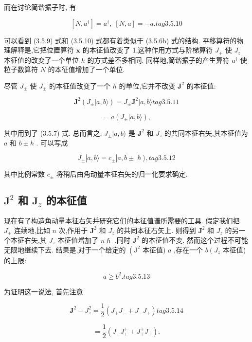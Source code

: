 而在讨论简谐振子时, 有

$$
\left\lbrack {N,{a}^{ \dagger }}\right\rbrack = {a}^{ \dagger },\;\left\lbrack {N, a}\right\rbrack = - a. tag{3. 5.10}
$$

可以看到 (3.5.9) 式和 (3.5.10) 式都有着类似于 (3.5.6b) 式的结构. 平移算符的物理解释是,它把位置算符 $\mathbf{x}$ 的本征值改变了 1,这种作用方式与阶梯算符 ${J}_{ + }$ 使 ${J}_{z}$ 本征值的改变了一个单位 $h$ 的方式差不多相同. 同样地,简谐振子的产生算符 ${a}^{ \dagger }$ 使粒子数算符 $N$ 的本征值增加了一个单位.

尽管 ${J}_{ \pm }$ 使 ${J}_{ \pm }$ 的本征值改变了一个 $h$ 的单位,它并不改变 ${\mathbf{J}}^{2}$ 的本征值:

$$
{\mathbf{J}}^{2}\left( {{J}_{ \pm }|a, b\rangle }\right) = {J}_{ \pm }{\mathbf{J}}^{2}|a, b\rangle tag{3. 5.11}
$$

$$
= a\left( {{J}_{ \pm }|a, b\rangle }\right) ,
$$

其中用到了 (3.5.7) 式. 总而言之, ${J}_{ \pm }|a, b\rangle$ 是 ${\mathbf{J}}^{2}$ 和 ${J}_{z}$ 的共同本征右矢,其本征值为 $a$ 和 $b \pm h$ . 可以写成

$$
{J}_{ \pm }\left| {a, b\rangle = {c}_{ \pm }}\right| a, b \pm \hslash \rangle , tag{3. 5.12}
$$

其中比例常数 ${c}_{ \pm }$ 将稍后由角动量本征右矢的归一化要求确定.

\subsection{${\mathbf{J}}^{2}$ 和 ${\mathbf{J}}_{z}$ 的本征值}

现在有了构造角动量本征右矢并研究它们的本征值谱所需要的工具. 假定我们把 ${J}_{ + }$ 连续地,比如 $n$ 次,作用于 ${\mathbf{J}}^{2}$ 和 ${J}_{z}$ 的共同本征右矢上. 则得到 ${\mathbf{J}}^{2}$ 和 ${J}_{z}$ 的另一个本征右矢,其 ${J}_{z}$ 本征值增加了 $n\hslash$ ,同时 ${\mathbf{J}}^{2}$ 的本征值不变. 然而这个过程不可能无限地继续下去. 结果是,对于一个给定的 $\left( {\mathrm{J}}^{2}\right.$ 本征值) $a$ ,存在一个 $b\left( {J}_{z}\right.$ 本征值) 的上限:

$$
a \geq {b}^{2}\text{.} tag{3.5.13}
$$

为证明这一说法, 首先注意

$$
{\mathbf{J}}^{2} - {J}_{z}^{2} = \frac{1}{2}\left( {{J}_{ + }{J}_{ - } + {J}_{ - }{J}_{ + }}\right) tag{3. 5.14}
$$

$$
= \frac{1}{2}\left( {{J}_{ + }{J}_{ + }^{ + } + {J}_{ + }^{ + }{J}_{ + }}\right) .
$$

